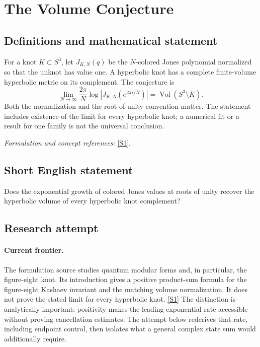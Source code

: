 \documentclass[11pt,a4paper]{article}
\newcommand{\sref}[2]{\hyperlink{source:#1:#2}{[S#2]}}
\newif\ifshowcatalogue
\newcommand{\cataloguescope}[1]{\ifshowcatalogue
 \paragraph{Exact scope in the supplied catalogue.}
 \begin{quote}\small #1\end{quote}\fi}
\numberwithin{equation}{section}
\begin{document}
\setcounter{section}{0}
\clearpage
\section*{\texorpdfstring{The Volume Conjecture}{The Volume Conjecture}}\label{34}
\subsection{Definitions and mathematical statement}
For a knot $K\subset S^3$, let $J_{K,N}(q)$ be the $N$-colored Jones polynomial normalized so that the unknot has value one. A hyperbolic knot has a complete finite-volume hyperbolic metric on its complement. The conjecture is
\[
 \lim_{N\to\infty}\frac{2\pi}{N}\log\left|J_{K,N}(e^{2\pi i/N})\right|
 =\operatorname{Vol}(S^3\setminus K).
\]
Both the normalization and the root-of-unity convention matter. The statement includes existence of the limit for every hyperbolic knot; a numerical fit or a result for one family is not the universal conclusion.
\par\smallskip\textit{Formulation and concept references:} \sref{34}{1}.
\cataloguescope{Prove or disprove that for every hyperbolic knot K in S\textasciicircum{}3, the limit as N tends to infinity of (2*pi/N) log|J\_\{K,N\}(exp(2*pi*i/N))| equals the hyperbolic volume of S\textasciicircum{}3 minus K, using the standard normalized N-colored Jones polynomial.}
\subsection{Short English statement}
Does the exponential growth of colored Jones values at roots of unity recover the hyperbolic volume of every hyperbolic knot complement?
\subsection{Research attempt}

\paragraph{Current frontier.}
The formulation source studies quantum modular forms and, in particular,
the figure-eight knot.  Its introduction gives a positive product-sum
formula for the figure-eight Kashaev invariant and the matching volume
normalization.  It does not prove the stated limit for every hyperbolic
knot. \sref{34}{1}
The distinction is analytically important: positivity makes the leading
exponential rate accessible without proving cancellation estimates.
The attempt below rederives that rate, including endpoint control, then
isolates what a general complex state sum would additionally require.
\end{document}
